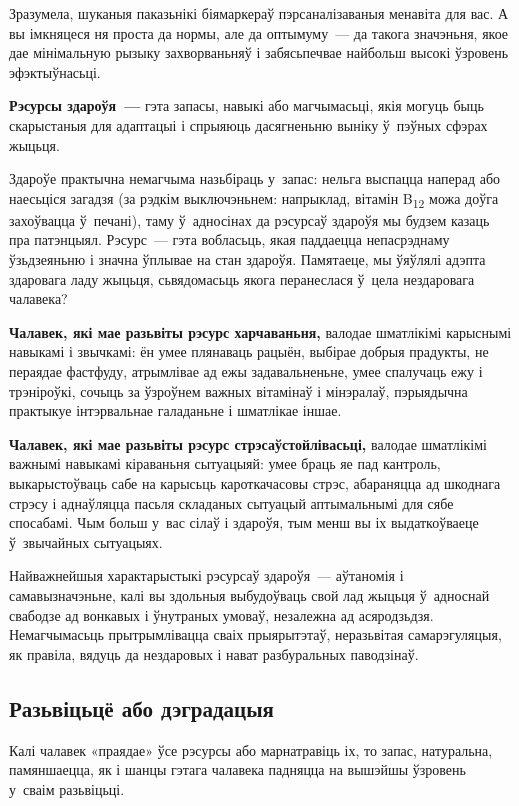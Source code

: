 Зразумела, шуканыя паказьнікі біямаркераў пэрсаналізаваныя менавіта для вас. А вы імкняцеся ня проста да нормы, але да оптымуму~--- да такога значэньня, якое дае мінімальную рызыку захворваньняў і забясьпечвае найбольш высокі ўзровень эфэктыўнасьці.

\textbf{Рэсурсы здароўя~---} гэта запасы, навыкі або магчымасьці, якія могуць быць скарыстаныя для адаптацыі і спрыяюць дасягненьню выніку ў~пэўных сфэрах жыцьця.

Здароўе практычна немагчыма назьбіраць у~запас: нельга выспацца наперад або наесьціся загадзя (за рэдкім выключэньнем: напрыклад, вітамін B\textsubscript{12} можа доўга захоўвацца ў~печані), таму ў~адносінах да рэсурсаў здароўя мы будзем казаць пра патэнцыял. Рэсурс~--- гэта вобласьць, якая паддаецца непасрэднаму ўзьдзеяньню і значна ўплывае на стан здароўя. Памятаеце, мы ўяўлялі адэпта здаровага ладу жыцьця, сьвядомасьць якога перанеслася ў~цела нездаровага чалавека?

\textbf{Чалавек, які мае разьвіты рэсурс харчаваньня,} валодае шматлікімі карыснымі навыкамі і звычкамі: ён умее плянаваць рацыён, выбірае добрыя прадукты, не пераядае фастфуду, атрымлівае ад ежы задавальненьне, умее спалучаць ежу і трэніроўкі, сочыць за ўзроўнем важных вітамінаў і мінэралаў, пэрыядычна практыкуе інтэрвальнае галаданьне і шматлікае іншае.

\textbf{Чалавек, які мае разьвіты рэсурс стрэсаўстойлівасьці,} валодае шматлікімі важнымі навыкамі кіраваньня сытуацыяй: умее браць яе пад кантроль, выкарыстоўваць сабе на карысьць кароткачасовы стрэс, абараняцца ад шкоднага стрэсу і аднаўляцца пасьля складаных сытуацый аптымальнымі для сябе спосабамі. Чым больш у~вас сілаў і здароўя, тым менш вы іх выдаткоўваеце ў~звычайных сытуацыях.

Найважнейшыя характарыстыкі рэсурсаў здароўя~--- аўтаномія і самавызначэньне, калі вы здольныя выбудоўваць свой лад жыцьця ў~адноснай свабодзе ад вонкавых і ўнутраных умоваў, незалежна ад асяродзьдзя. Немагчымасьць прытрымлівацца сваіх прыярытэтаў, неразьвітая самарэгуляцыя, як правіла, вядуць да нездаровых і нават разбуральных паводзінаў.

\subsection*{Разьвіцьцё або дэградацыя} 

Калі чалавек «праядае» ўсе рэсурсы або марнатравіць іх, то запас, натуральна, памяншаецца, як і шанцы гэтага чалавека падняцца на вышэйшы ўзровень у~сваім разьвіцьці. 

